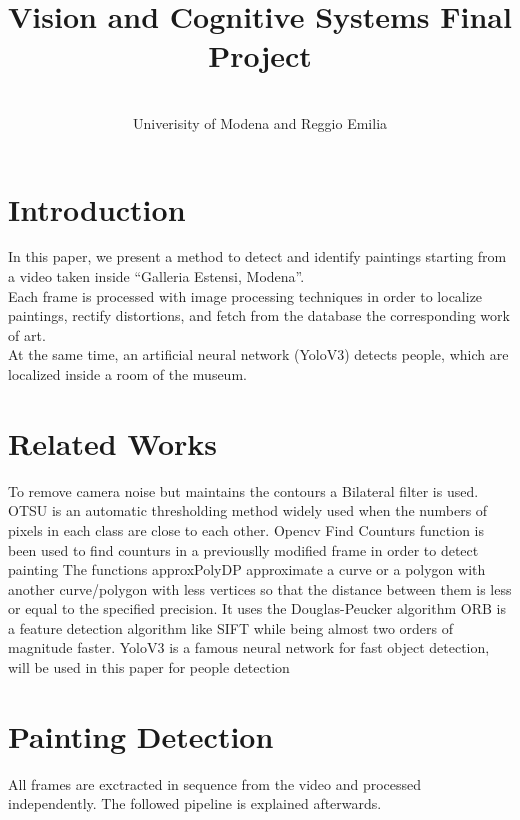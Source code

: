 \documentclass[conference]{IEEEtran}
\begin{document}
\title{Vision and Cognitive Systems Final Project}
\author{
\and
{}
\\
\large{Univerisity of Modena and Reggio Emilia}
\and
{}
}
\maketitle


\section{Introduction}
In this paper, we present a method to detect and identify paintings starting from a video taken inside “Galleria Estensi, Modena”.\\
Each frame is processed with image processing techniques in order to localize paintings, rectify distortions, and fetch from the database the corresponding work of art.\\
At the same time, an artificial neural network (YoloV3) detects people, which are localized inside a room of the museum.

\section{Related Works}
To remove camera noise but maintains the contours a  Bilateral filter\cite{b1} is used.
OTSU\cite{b2} is an automatic thresholding method widely used when the numbers of pixels in each class are close to each other.
Opencv Find Counturs\cite{b3} function is been used to find counturs in a previouslly modified frame in order to detect painting
The functions approxPolyDP\cite{b4} approximate a curve or a polygon with another curve/polygon with less vertices so that the distance between them is less or equal to the specified precision. It uses the Douglas-Peucker algorithm  
ORB\cite{b5} is a feature detection algorithm like SIFT while being almost two orders of magnitude faster.
YoloV3 \cite{b5}  is a famous neural network for fast object detection, will be used in this paper for people detection

\section{Painting Detection}
All frames are exctracted in sequence from the video and processed independently. The followed pipeline is explained afterwards.
\end{document}
